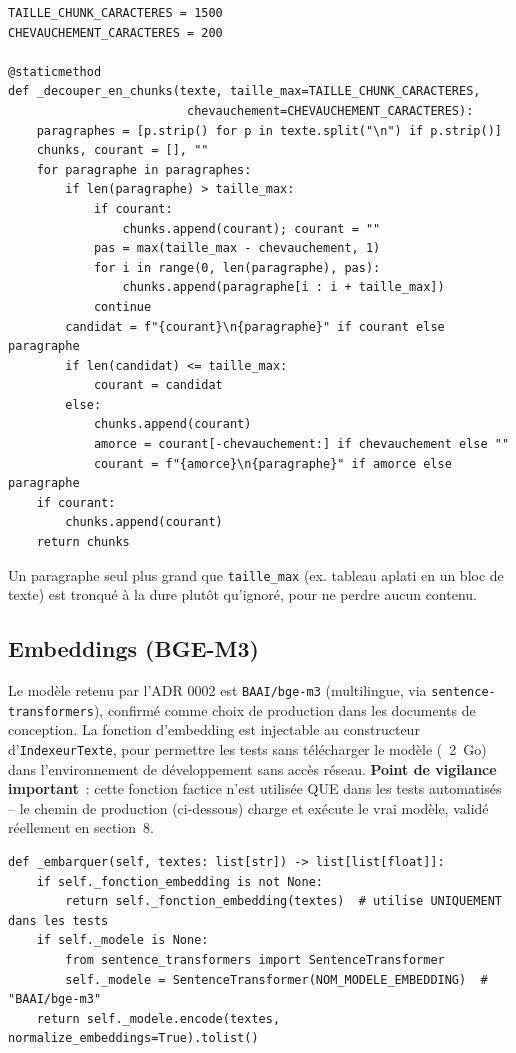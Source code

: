 \documentclass[11pt,a4paper]{article}
\begin{document}
\begin{lstlisting}[caption={\texttt{src/indexeur\_texte.py} -- decoupage par paragraphe, empaquetage glouton}]
TAILLE_CHUNK_CARACTERES = 1500
CHEVAUCHEMENT_CARACTERES = 200

@staticmethod
def _decouper_en_chunks(texte, taille_max=TAILLE_CHUNK_CARACTERES,
                         chevauchement=CHEVAUCHEMENT_CARACTERES):
    paragraphes = [p.strip() for p in texte.split("\n") if p.strip()]
    chunks, courant = [], ""
    for paragraphe in paragraphes:
        if len(paragraphe) > taille_max:
            if courant:
                chunks.append(courant); courant = ""
            pas = max(taille_max - chevauchement, 1)
            for i in range(0, len(paragraphe), pas):
                chunks.append(paragraphe[i : i + taille_max])
            continue
        candidat = f"{courant}\n{paragraphe}" if courant else paragraphe
        if len(candidat) <= taille_max:
            courant = candidat
        else:
            chunks.append(courant)
            amorce = courant[-chevauchement:] if chevauchement else ""
            courant = f"{amorce}\n{paragraphe}" if amorce else paragraphe
    if courant:
        chunks.append(courant)
    return chunks
\end{lstlisting}

Un paragraphe seul plus grand que \texttt{taille\_max} (ex. tableau aplati en un bloc de texte) est tronqu\'e \`a la dure plut\^ot qu'ignor\'e, pour ne perdre aucun contenu.

\subsection{Embeddings (BGE-M3)}
Le mod\`ele retenu par l'ADR 0002 est \texttt{BAAI/bge-m3} (multilingue, via \texttt{sentence-transformers}), confirm\'e comme choix de production dans les documents de conception. La fonction d'embedding est injectable au constructeur d'\texttt{IndexeurTexte}, pour permettre les tests sans t\'el\'echarger le mod\`ele (~2~Go) dans l'environnement de d\'eveloppement sans acc\`es r\'eseau. \textbf{Point de vigilance important}~: cette fonction factice n'est utilis\'ee QUE dans les tests automatis\'es -- le chemin de production (ci-dessous) charge et ex\'ecute le vrai mod\`ele, valid\'e r\'eellement en section~8.

\begin{lstlisting}[caption={\texttt{src/indexeur\_texte.py} -- chargement paresseux du vrai modele}]
def _embarquer(self, textes: list[str]) -> list[list[float]]:
    if self._fonction_embedding is not None:
        return self._fonction_embedding(textes)  # utilise UNIQUEMENT dans les tests
    if self._modele is None:
        from sentence_transformers import SentenceTransformer
        self._modele = SentenceTransformer(NOM_MODELE_EMBEDDING)  # "BAAI/bge-m3"
    return self._modele.encode(textes, normalize_embeddings=True).tolist()
\end{lstlisting}
\end{document}
